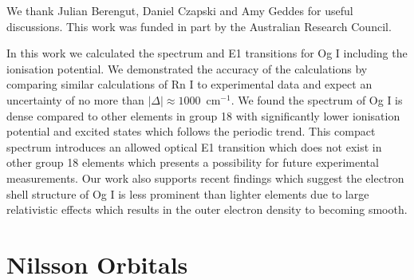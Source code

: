 \documentclass[10pt,a4paper, twoside]{report}
\begin{document}
We thank Julian Berengut, Daniel Czapski and Amy Geddes for useful discussions.
This work was funded in part by the Australian Research Council.

In this work we calculated the spectrum and E1 transitions for Og I including the ionisation potential. We demonstrated the accuracy of the calculations by comparing similar calculations of Rn I to experimental data and expect an uncertainty of no more than $|\Delta| \approx 1000$~cm$^{-1}$. We found the spectrum of Og I is dense compared to other elements in  group 18 with significantly lower ionisation potential and excited states which follows the periodic trend. This compact spectrum introduces an allowed optical E1 transition which does not exist in other group 18 elements which presents a possibility for future experimental measurements. Our work also supports recent findings\cite{Jerabek2018} which suggest the electron shell structure of Og I is less prominent than lighter elements due to large relativistic effects which results in the outer electron density to becoming smooth. \\


\appendix



\chapter{Nilsson Orbitals}
\end{document}
